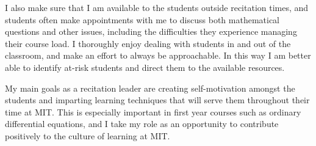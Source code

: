 \documentclass[11pt]{article}
\begin{document}
I also make sure that I am available to the students outside recitation times, and students often make appointments with me to discuss both mathematical questions and other issues, including the difficulties they experience managing their course load. I thoroughly enjoy dealing with students in and out of the classroom, and make an effort to always be approachable. In this way I am better able to identify at-risk students and direct them to the available resources.

My main goals as a recitation leader are creating self-motivation amongst the students and imparting learning techniques that will serve them throughout their time at MIT. This is especially important in first year courses such as ordinary differential equations, and I take my role as an opportunity to contribute positively to the culture of learning at MIT.
\end{document}
